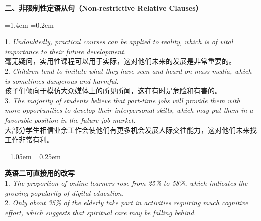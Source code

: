 \documentclass[11pt,a4paper]{ctexart}
\newcommand{\en}[1]{\textit{#1}}
\newenvironment{note}{%
  \par\addvspace{5pt}%
  \begin{list}{}{\leftmargin=1.05em \rightmargin=0.25em \listparindent=0pt
    \itemindent=0pt \topsep=0pt \parsep=2pt \itemsep=2pt \partopsep=0pt}%
  \item\relax\small\color{ink}%
}{%
  \end{list}\addvspace{5pt}%
}
\newenvironment{eg}{%
  \par\addvspace{4pt}%
  \begin{list}{}{\leftmargin=1.4em \rightmargin=0.2em \listparindent=0pt
    \itemindent=0pt \topsep=0pt \parsep=2pt \itemsep=2pt \partopsep=0pt}%
  \item\relax
}{%
  \end{list}\addvspace{5pt}%
}
\begin{document}
\par\addvspace{6pt}\noindent\textbf{二、非限制性定语从句（Non-restrictive Relative Clauses）}\par\addvspace{2pt}
\begin{eg}
1. \en{Undoubtedly, practical courses can be applied to reality, which is of vital importance to their future development.}\\
毫无疑问，实用性课程可以用于实际，这对他们未来的发展是非常重要的。\\
2. \en{Children tend to imitate what they have seen and heard on mass media, which is sometimes dangerous and harmful.}\\
孩子们倾向于模仿大众媒体上的所见所闻，这在有时是危险和有害的。\\
3. \en{The majority of students believe that part-time jobs will provide them with more opportunities to develop their interpersonal skills, which may put them in a favorable position in the future job market.}\\
大部分学生相信业余工作会使他们有更多机会发展人际交往能力，这对他们未来找工作非常有利。\\
\end{eg}
\begin{note}
\textbf{英语二可直接用的改写}\\
1. \en{The proportion of online learners rose from 25\% to 58\%, which indicates the growing popularity of digital education.}\\
2. \en{Only about 35\% of the elderly take part in activities requiring much cognitive effort, which suggests that spiritual care may be falling behind.}
\end{note}
\end{document}
